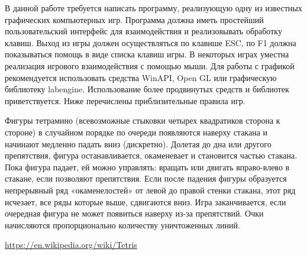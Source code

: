 
В данной работе требуется написать программу, реализующую одну из известных 
графических компьютерных игр. Программа должна иметь простейший пользовательский 
интерфейс для взаимодействия и реализовывать обработку клавиш. Выход из игры 
должен осуществляться по клавише ESC, по F1 должна показываться помощь в виде 
списка клавиш игры. В некоторых играх уместна реализация игрового взаимодействия 
с помощью мыши. Для работы с графикой рекомендуется использовать средства WinAPI,
Open GL или графическую библиотеку labengine. Использование
более продвинутых средств и библиотек приветствуется. Ниже перечислены 
приблизительные правила игр.

\zzsectionCOMMENTS

\zzsectionPLAN

\zzsectionVARIATIONS

\begin{zztask}[Tetris, 1984]
Фигуры тетрамино (всевозможные стыковки четырех квадратиков сторона к стороне)
в случайном порядке по очереди появляются наверху стакана и начинают медленно
падать вниз (дискретно). Долетая до дна или другого препятствия, фигура
останавливается, окаменевает и становится частью стакана. Пока фигура падает,
ей можно управлять: вращать или двигать вправо-влево в стакане, если позволяют
препятствия. Если после падения фигуры образуется непрерывный ряд
«окаменелостей» от левой до правой стенки стакана, этот ряд исчезает, все ряды
которые выше, сдвигаются вниз. Игра заканчивается, если очередная фигура не
может появиться наверху из-за препятствий. Очки начисляются пропорционально
количеству уничтоженных линий.
\begin{flushright}
 \url{https://en.wikipedia.org/wiki/Tetris}
\end{flushright}
\end{zztask}

